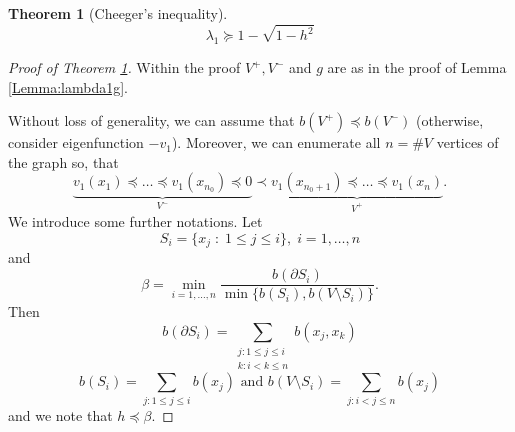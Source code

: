 \documentclass[10pt,a4paper]{amsart}
\newtheorem{theorem}{Theorem}
\newcommand{\weight}{b}
\begin{document}
\begin{theorem}[Cheeger's inequality]\label{Theorem::Cheeger}
\begin{equation*}
\lambda_1\succeq 1-\sqrt{1-h^2}
\end{equation*}
\end{theorem}

\begin{proof}[Proof of Theorem \ref{Theorem::Cheeger}]
Within the proof $V^+, V^-$ and $g$ are as in the proof of Lemma \ref{Lemma:lambda1g}.

Without loss of generality, we can assume that $\weight (V^+)\preceq \weight (V^-)$ (otherwise, consider eigenfunction $-v_1$). Moreover, we can enumerate all $n=\#V$ vertices of the graph so, that 
\begin{equation*}
\underbrace{v_1(x_1)\preceq\dots \preceq v_1(x_{n_0})\preceq 0}_{V^-}\prec\underbrace{ v_1(x_{n_0+1})\preceq\dots\preceq v_1(x_{n})}_{V^+}.
\end{equation*}
We introduce some further notations. Let
\begin{equation*}
S_i = \{x_j\;:\; 1\le j \le i\},\; i= {1,\dots, n}
\end{equation*}
and
\begin{equation*}
\beta = \min_{i= {1,\dots, n}} \dfrac{\weight(\partial S_i)}{\min\{\weight(S_i), \weight(V\setminus S_i)\}}.
\end{equation*}
Then
\begin{equation*}
\weight(\partial S_i) = \sum_{\substack{j: 1\le j \le i\\k: i<k\le n}}  \weight (x_j,x_k)
\end{equation*}
\begin{equation*}
\weight(S_i) = \sum_{j: 1\le j \le  i}  \weight (x_j)\mbox{ and } \weight(V\setminus S_i) = \sum_{j: i< j \le n}  \weight (x_j)
\end{equation*}
and we note that $h\preceq\beta$.




\end{proof}
\end{document}
